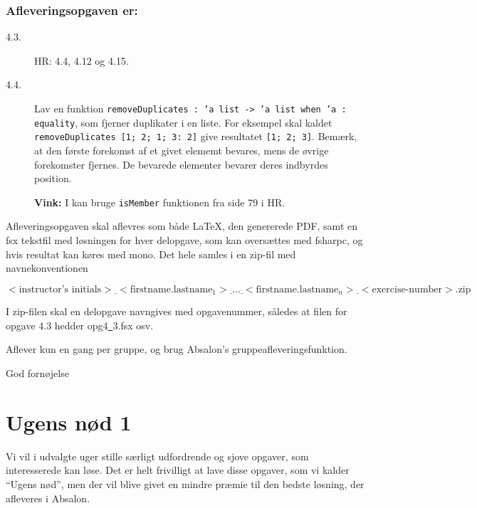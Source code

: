 \documentclass[a4paper]{article}
\begin{document}
\subsubsection*{Afleveringsopgaven er:}


\begin{description}
\item[4.3.] HR: 4.4, 4.12 og 4.15.

\item[4.4.] Lav en funktion \texttt{removeDuplicates : 'a list -> 'a list
  when 'a : equality}, som fjerner duplikater i en liste.  For
  eksempel skal kaldet \texttt{removeDuplicates [1; 2; 1; 3: 2]}
  give resultatet \texttt{[1; 2; 3]}.  Bemærk, at den første
  forekomst af et givet elememt bevares, mens de øvrige forekomster
  fjernes.  De bevarede elementer bevarer deres indbyrdes position.

\textbf{Vink:} I kan bruge \texttt{isMember} funktionen fra side 79 i HR.

\end{description}

\noindent
Afleveringsopgaven skal aflevres som både \LaTeX, den genererede PDF,
samt en fsx tekstfil med løsningen for hver delopgave, som kan
oversættes med fsharpc, og hvis resultat kan køres med mono.  Det hele
samles i en zip-fil med navnekonventionen

\[
{<}\textrm{instructor's initials}{>}\underline{~}{<}\textrm{firstname.lastname}_1{>}\underline{~}\ldots\underline{~}{<}\textrm{firstname.lastname}_n{>}\underline{~}{<}\textrm{exercise-number}{>}.\textrm{zip}
\]

\noindent
I zip-filen skal en delopgave navngives med opgavenummer, således at filen for opgave 4.3 hedder opg4\underline{~}3.fsx osv.

Aflever kun en gang per gruppe, og brug Absalon's
gruppeafleveringsfunktion.

\vspace{1ex}

\hfill God fornøjelse

\section*{Ugens nød 1}

Vi vil i udvalgte uger stille særligt udfordrende og sjove opgaver,
som interesserede kan løse.  Det er helt frivilligt at lave disse
opgaver, som vi kalder ``Ugens nød'', men der vil blive givet en
mindre præmie til den bedste løsning, der afleveres i Absalon.
\end{document}
